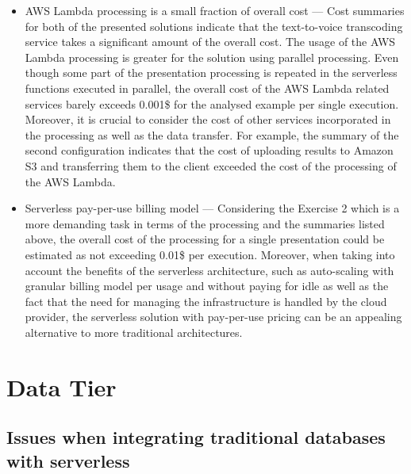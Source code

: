 \begin{itemize}
   \item AWS Lambda processing is a small fraction of overall cost --- Cost summaries for both of the presented solutions indicate that the text-to-voice transcoding service takes a significant amount of the overall cost.
   The usage of the AWS Lambda processing is greater for the solution using parallel processing.
   Even though some part of the presentation processing is repeated in the serverless functions executed in parallel, the overall cost of the AWS Lambda related services barely exceeds 0.001\$ for the analysed example per single execution.
   Moreover, it is crucial to consider the cost of other services incorporated in the processing as well as the data transfer.
   For example, the summary of the second configuration indicates that the cost of uploading results to Amazon S3 and transferring them to the client exceeded the cost of the processing of the AWS Lambda.
   \item Serverless pay-per-use billing model --- Considering the Exercise 2 which is a more demanding task in terms of the processing and the summaries listed above, the overall cost of the processing for a single presentation could be estimated as not exceeding 0.01\$ per execution.
   Moreover, when taking into account the benefits of the serverless architecture, such as auto-scaling with granular billing model per usage and without paying for idle as well as the fact that the need for managing the infrastructure is handled by the cloud provider, the serverless solution with pay-per-use pricing can be an appealing alternative to more traditional architectures.
\end{itemize}


\section{Data Tier}

\subsection{Issues when integrating traditional databases with serverless}


